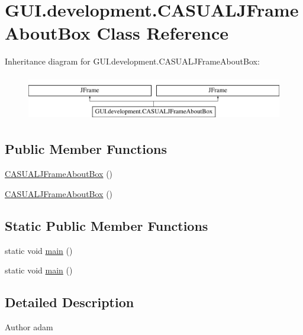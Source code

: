 \hypertarget{classGUI_1_1development_1_1CASUALJFrameAboutBox}{\section{G\-U\-I.\-development.\-C\-A\-S\-U\-A\-L\-J\-Frame\-About\-Box Class Reference}
\label{classGUI_1_1development_1_1CASUALJFrameAboutBox}
}
Inheritance diagram for G\-U\-I.\-development.\-C\-A\-S\-U\-A\-L\-J\-Frame\-About\-Box\-:\begin{figure}[H]
\begin{center}
\leavevmode
\includegraphics[height=2.000000cm]{classGUI_1_1development_1_1CASUALJFrameAboutBox}
\end{center}
\end{figure}
\subsection*{Public Member Functions}
\begin{DoxyCompactItemize}
\item 
\hyperlink{classGUI_1_1development_1_1CASUALJFrameAboutBox_a8323c1fa354fb8f2ecdaf5e373c77423}{C\-A\-S\-U\-A\-L\-J\-Frame\-About\-Box} ()
\item 
\hyperlink{classGUI_1_1development_1_1CASUALJFrameAboutBox_a8323c1fa354fb8f2ecdaf5e373c77423}{C\-A\-S\-U\-A\-L\-J\-Frame\-About\-Box} ()
\end{DoxyCompactItemize}
\subsection*{Static Public Member Functions}
\begin{DoxyCompactItemize}
\item 
static void \hyperlink{classGUI_1_1development_1_1CASUALJFrameAboutBox_ab86c75e03d79f695e1b26b10037f63bc}{main} ()
\item 
static void \hyperlink{classGUI_1_1development_1_1CASUALJFrameAboutBox_ab86c75e03d79f695e1b26b10037f63bc}{main} ()
\end{DoxyCompactItemize}


\subsection{Detailed Description}
\begin{DoxyAuthor}{Author}
adam 
\end{DoxyAuthor}


